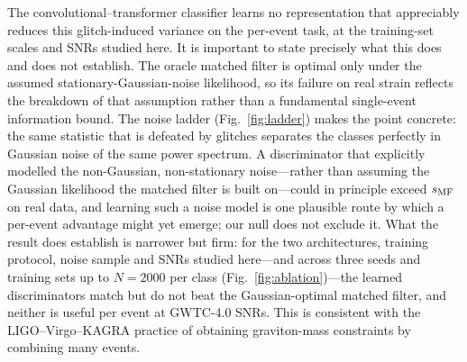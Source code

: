 \documentclass[11pt,a4paper]{article}
\begin{document}
The convolutional--transformer classifier learns no representation that
appreciably reduces this glitch-induced variance on the per-event task,
at the training-set scales and SNRs studied here. It is important to state
precisely what this does and does not establish. The oracle matched
filter is optimal only under the assumed stationary-Gaussian-noise
likelihood, so its failure on real strain reflects the breakdown of that
assumption rather than a fundamental single-event information bound. The
noise ladder (Fig.~\ref{fig:ladder}) makes the point concrete: the same
statistic that is defeated by glitches separates the classes perfectly in
Gaussian noise of the same power spectrum. A discriminator that explicitly
modelled the non-Gaussian, non-stationary noise---rather than assuming the
Gaussian likelihood the matched filter is built on---could in principle
exceed $s_{\rm MF}$ on real data, and learning such a noise model is one
plausible route by which a per-event advantage might yet emerge; our null
does not exclude it. What the result does establish is narrower but firm:
for the two architectures, training protocol, noise sample and SNRs studied
here---and across three seeds and training sets up to $N=2000$ per class
(Fig.~\ref{fig:ablation})---the learned discriminators match but do not beat
the Gaussian-optimal matched filter, and neither is useful per event at
GWTC-4.0 SNRs. This is consistent with the LIGO--Virgo--KAGRA practice of
obtaining graviton-mass constraints by combining many events.
\end{document}
